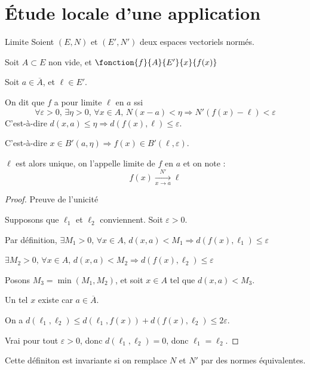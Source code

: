 \section{Étude locale d'une application}

\begin{definition}{Limite}{}
    Soient $(E, N)$ et $(E', N')$ deux espaces vectoriels normés. 

    Soit $A \subset E$ non vide, et $\fonction{f}{A}{E'}{x}{f(x)}$

    Soit $a \in \overline A$, et $\ell \in E'$.

    On dit que $f$ a pour limite $\ell$ en $a$ ssi 
    \[\forall \varepsilon > 0, \, \exists \eta > 0, \, \forall x \in A, \, N(x - a) < \eta \Rightarrow N'(f(x) - \ell) < \varepsilon\]
    C'est-à-dire $d(x, a) \leqslant \eta \Rightarrow d(f(x), \ell) \leqslant \varepsilon$.

    C'est-à-dire $x \in B'(a, \eta) \Rightarrow f(x) \in B'(\ell, \varepsilon)$.

    $\ell$ est alors unique, on l'appelle limite de $f$ en $a$ et on note :
    \[f(x) \xrightarrow[x \to a ]{N'} \ell\]
\end{definition}

\begin{proof}
    Preuve de l'unicité 

    Supposons que $\ell_1$ et $\ell_2$ conviennent. Soit $\varepsilon > 0$.

    Par définition, $\exists M_1 > 0, \, \forall x \in A, \, d(x, a) < M_1  \Rightarrow d(f(x), \ell_1) \leqslant \varepsilon$

    $\exists M_2 > 0, \, \forall x \in A, \, d(x, a) < M_2  \Rightarrow d(f(x), \ell_2) \leqslant \varepsilon$

    Posons $M_3 = \min(M_1, M_2)$, et soit $x \in A$ tel que $d(x, a) < M_3$.

    Un tel $x$ existe car $a \in \overline A$.

    On a $d(\ell_1, \ell_2) \leqslant d(\ell_1, f(x)) + d(f(x), \ell_2) \leqslant 2 \varepsilon$.

    Vrai pour tout $\varepsilon > 0$, donc $d(\ell_1, \ell_2) = 0$, donc $\ell_1 = \ell_2$.
\end{proof}

\begin{remarque}
    Cette définiton est invariante si on remplace $N$ et $N'$ par des normes équivalentes.
\end{remarque}

